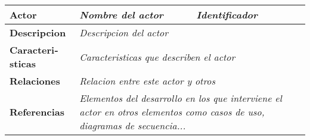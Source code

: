 \begin{tabular}{l|l|p{5cm}}
\textbf{Actor} & \textit{Nombre del actor} & \textit{Identificador} \\ \hline
\textbf{Descripcion} & \multicolumn{2}{l}{\textit{Descripcion del actor}} \\ \hline
\textbf{Caracteri­sticas} & \multicolumn{2}{l}{\textit{Caracteri­sticas que describen el actor}} \\ \hline
\textbf{Relaciones} & \multicolumn{2}{l}{\textit{Relacion entre este actor y otros}} \\ \hline
\textbf{Referencias} & \multicolumn{2}{p{10cm}}{\textit{Elementos del desarrollo en los que interviene el actor en otros elementos como casos de uso, diagramas de secuencia...}} \\
\end{tabular}
